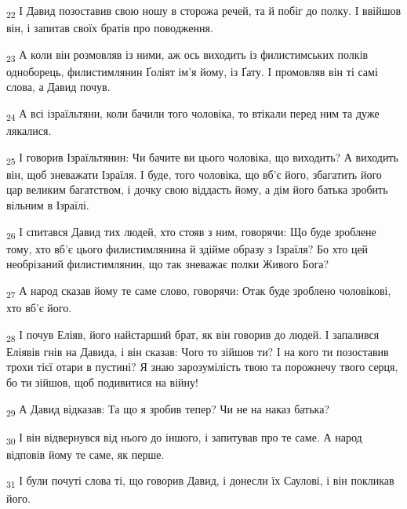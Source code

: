 \begin{tcolorbox}
\textsubscript{22} І Давид позоставив свою ношу в сторожа речей, та й побіг до полку. І ввійшов він, і запитав своїх братів про поводження.
\end{tcolorbox}
\begin{tcolorbox}
\textsubscript{23} А коли він розмовляв із ними, аж ось виходить із филистимських полків одноборець, филистимлянин Ґоліят ім'я йому, із Ґату. І промовляв він ті самі слова, а Давид почув.
\end{tcolorbox}
\begin{tcolorbox}
\textsubscript{24} А всі ізраїльтяни, коли бачили того чоловіка, то втікали перед ним та дуже лякалися.
\end{tcolorbox}
\begin{tcolorbox}
\textsubscript{25} І говорив Ізраїльтянин: Чи бачите ви цього чоловіка, що виходить? А виходить він, щоб зневажати Ізраїля. І буде, того чоловіка, що вб'є його, збагатить його цар великим багатством, і дочку свою віддасть йому, а дім його батька зробить вільним в Ізраїлі.
\end{tcolorbox}
\begin{tcolorbox}
\textsubscript{26} І спитався Давид тих людей, хто стояв з ним, говорячи: Що буде зроблене тому, хто вб'є цього филистимлянина й здійме образу з Ізраїля? Бо хто цей необрізаний филистимлянин, що так зневажає полки Живого Бога?
\end{tcolorbox}
\begin{tcolorbox}
\textsubscript{27} А народ сказав йому те саме слово, говорячи: Отак буде зроблено чоловікові, хто вб'є його.
\end{tcolorbox}
\begin{tcolorbox}
\textsubscript{28} І почув Еліяв, його найстарший брат, як він говорив до людей. І запалився Еліявів гнів на Давида, і він сказав: Чого то зійшов ти? І на кого ти позоставив трохи тієї отари в пустині? Я знаю зарозумілість твою та порожнечу твого серця, бо ти зійшов, щоб подивитися на війну!
\end{tcolorbox}
\begin{tcolorbox}
\textsubscript{29} А Давид відказав: Та що я зробив тепер? Чи не на наказ батька?
\end{tcolorbox}
\begin{tcolorbox}
\textsubscript{30} І він відвернувся від нього до іншого, і запитував про те саме. А народ відповів йому те саме, як перше.
\end{tcolorbox}
\begin{tcolorbox}
\textsubscript{31} І були почуті слова ті, що говорив Давид, і донесли їх Саулові, і він покликав його.
\end{tcolorbox}
